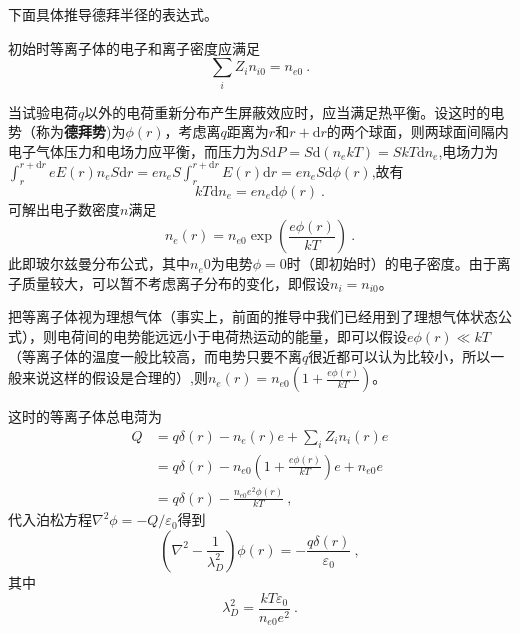 下面具体推导德拜半径的表达式。

初始时等离子体的电子和离子密度应满足
			\begin{equation} 
			\sum_i Z_i n_{i0}=n_{e0}~.
			\end{equation}
			
当试验电荷$q$以外的电荷重新分布产生屏蔽效应时，应当满足热平衡。设这时的电势（称为\textbf{德拜势})为$\phi(r)$，考虑离$q$距离为$r$和$r+\mathrm{d} r$的两个球面，则两球面间隔内电子气体压力和电场力应平衡，而压力为$S\mathrm{d}P=S\mathrm{d}(n_ekT)=SkT\mathrm{d}n_e$,电场力为$\int_r^{r+\mathrm{d}r} eE(r)n_eS\mathrm{d}r=en_eS\int_r^{r+\mathrm{d}r}E(r)\mathrm{d}r=en_eS\mathrm{d}\phi(r)$,故有
			\begin{equation} 
			kT\mathrm{d}n_e=en_e\mathrm{d}\phi(r)~.
			\end{equation}
可解出电子数密度$n$满足
			\begin{equation} 
			n_e(r)=n_{e0}\exp{\left( \frac{e\phi(r)}{kT}\right)}~.
			\end{equation}
此即玻尔兹曼分布公式，其中$n_e0$为电势$\phi=0$时（即初始时）的电子密度。由于离子质量较大，可以暂不考虑离子分布的变化，即假设$n_i=n_{i0}$。
			
把等离子体视为理想气体（事实上，前面的推导中我们已经用到了理想气体状态公式），则电荷间的电势能远远小于电荷热运动的能量，即可以假设$e\phi(r)\ll kT$（等离子体的温度一般比较高，而电势只要不离$q$很近都可以认为比较小，所以一般来说这样的假设是合理的）,则$n_e(r)=n_{e0}(1+\frac{e\phi(r)}{kT})$。
			
这时的等离子体总电菏为
			\begin{equation}
			\begin{aligned} 
			Q&=q\delta(r)-n_e(r)e+\sum_{i} Z_i n_{i}(r)e\\
			&=q\delta(r)-n_{e0}(1+\frac{e\phi(r)}{kT})e+n_{e0}e\\
			&=q\delta(r)-\frac{n_{e0}e^2\phi(r)}{kT}~,
			\end{aligned}
			\end{equation}
代入泊松方程$\nabla^2\phi=-Q/\varepsilon_0$得到
			\begin{equation} 
			(\nabla^2-\frac{1}{\lambda_D^2})\phi(r)=-\frac{q\delta(r)}{\varepsilon_0}~,
			\end{equation}
其中
			\begin{equation}
				\boxed{\lambda_D^2=\frac{kT\varepsilon_0}{n_{e0}e^2}}~.
			\end{equation}
			
